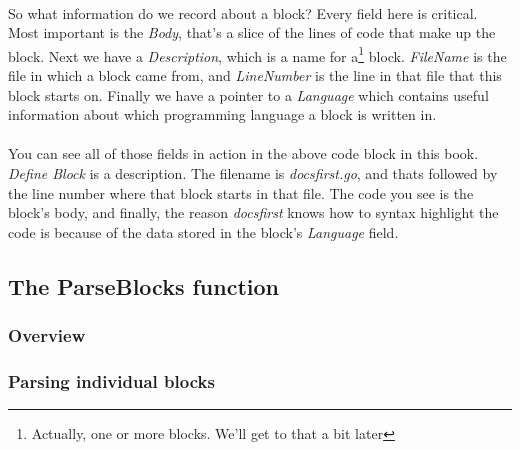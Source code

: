 \documentclass{article}
\begin{document}
\paragraph{}
So what information do we record about a block? Every field here is critical.
Most important is the \emph{Body}, that's a slice of the lines of code that make
up the block. Next we have a \emph{Description}, which is a name for
a\footnote{Actually, one or more blocks. We'll get to that a bit later} block.
\emph{FileName} is the file in which a block came from, and \emph{LineNumber}
is the line in that file that this block starts on. Finally we have a pointer to
a \emph{Language} which contains useful information about which programming
language a block is written in.

\paragraph{}
You can see all of those fields in action in the above code block in this book.
\emph{Define Block} is a description. The filename is \emph{docsfirst.go}, and
thats followed by the line number where that block starts in that file. The code
you see is the block's body, and finally, the reason \emph{docsfirst} knows how
to syntax highlight the code is because of the data stored in the block's
\emph{Language} field.

\subsection{The ParseBlocks function}

\subsubsection{Overview}
\paragraph{}
\paragraph{}
\paragraph{}
\subsubsection{Parsing individual blocks}
\end{document}
